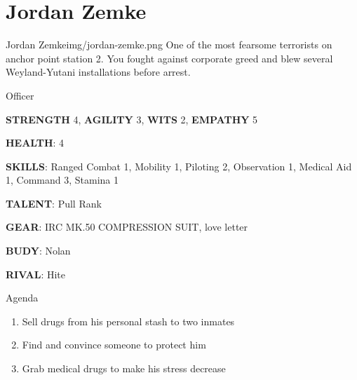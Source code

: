 \clearpage

\section{Jordan Zemke}


\begin{rpg-pcbox}{Jordan Zemke}{img/jordan-zemke.png}
    One of the most fearsome terrorists on anchor point station 2. You fought against corporate greed and blew several Weyland-Yutani installations before arrest. 
\end{rpg-pcbox}

\begin{rpg-commentbox}{}
    Officer

    \textbf{STRENGTH} 4, \textbf{AGILITY} 3, \textbf{WITS} 2, \textbf{EMPATHY} 5

    \textbf{HEALTH}: 4

    \textbf{SKILLS}: Ranged Combat 1, Mobility 1, Piloting 2, Observation 1, Medical Aid 1, Command 3, Stamina 1
    
    \textbf{TALENT}: Pull Rank
    
    \textbf{GEAR}: IRC MK.50 COMPRESSION SUIT, love letter

    \textbf{BUDY}: Nolan
    
    \textbf{RIVAL}: Hite
\end{rpg-commentbox}


\begin{rpg-commentbox}{Agenda}
    \begin{enumerate}[label=\textbf{Act \arabic*}, leftmargin=1cm]
        \item Sell drugs from his personal stash to two inmates
        \item Find and convince someone to protect him
        \item Grab medical drugs to make his stress decrease
    \end{enumerate}
\end{rpg-commentbox}


